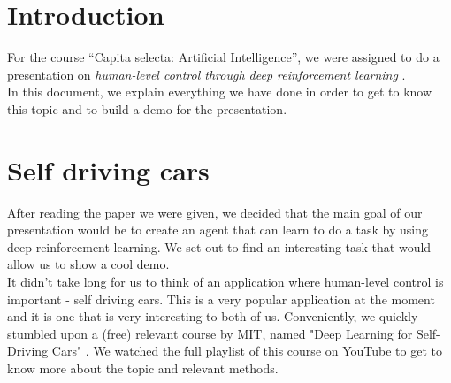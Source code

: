 \documentclass[12pt, conference, compsoc]{IEEEtran}
\begin{document}





%
\IEEEpeerreviewmaketitle



\section{Introduction}
For the course ``Capita selecta: Artificial Intelligence'', we were assigned to do a presentation on \emph{human-level control through deep reinforcement learning }.\\
In this document, we explain everything we have done in order to get to know this topic and to build a demo for the presentation.

\section{Self driving cars}
After reading the paper \cite{mnih2015humanlevel} we were given, we decided that the main goal of our presentation would be to create an agent that can learn to do a task by using deep reinforcement learning. We set out to find an interesting task that would allow us to show a cool demo.\\
It didn't take long for us to think of an application where human-level control is important - self driving cars. This is a very popular application at the moment and it is one that is very interesting to both of us. Conveniently, we quickly stumbled upon a (free) relevant course by MIT, named "Deep Learning for Self-Driving Cars" \cite{MIT:selfdriving-course}. We watched the full playlist of this course on YouTube to get to know more about the topic and relevant methods.
\end{document}
